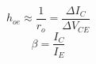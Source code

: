 %
\begin{equation}
  \label{eq:hoe}
  h_{oe} \approx \frac{1}{r_o} = \frac{\Delta I_C}{\Delta V_{CE}}
\end{equation}
\begin{equation}
  \label{eq:beta}
  \beta = \frac{I_C}{I_E}
\end{equation}


